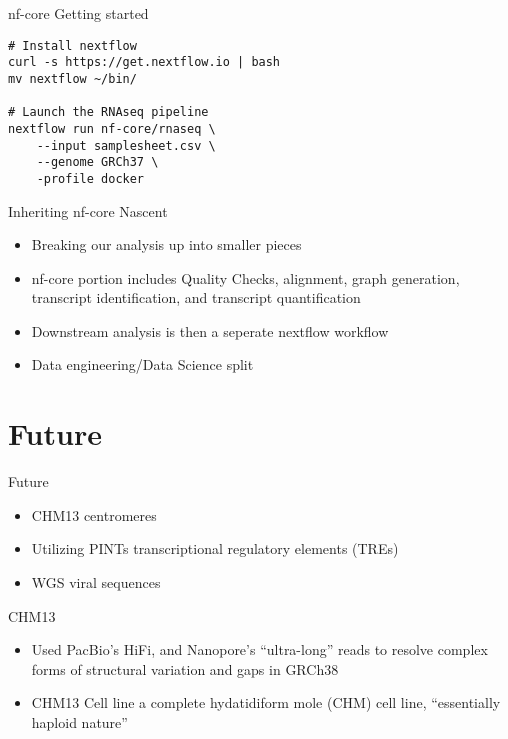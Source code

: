 \documentclass[bigger]{beamer}
\begin{document}
\begin{frame}[label={sec:org2425e9d},fragile]{nf-core Getting started}
 \begin{verbatim}
# Install nextflow
curl -s https://get.nextflow.io | bash
mv nextflow ~/bin/

# Launch the RNAseq pipeline
nextflow run nf-core/rnaseq \
    --input samplesheet.csv \
    --genome GRCh37 \
    -profile docker
\end{verbatim}
\end{frame}



\begin{frame}[label={sec:org5a1d10e}]{Inheriting nf-core Nascent}
\begin{itemize}
\item Breaking our analysis up into smaller pieces
\item nf-core portion includes Quality Checks, alignment, graph generation, transcript
identification, and transcript quantification
\item Downstream analysis is then a seperate nextflow workflow
\item Data engineering/Data Science split
\end{itemize}
\end{frame}

\section{Future}
\label{sec:org695a40f}
\begin{frame}[label={sec:org6420d42}]{Future}
\begin{itemize}
\item CHM13 centromeres
\item Utilizing PINTs transcriptional regulatory elements (TREs)
\item WGS viral sequences
\end{itemize}
\end{frame}

\begin{frame}[label={sec:org80c930e}]{CHM13}
\begin{itemize}
\item Used PacBio's HiFi, and Nanopore's ``ultra-long'' reads to resolve complex forms
of structural variation and gaps in GRCh38
\item CHM13 Cell line a complete hydatidiform mole (CHM) cell line, ``essentially
haploid nature''
\end{itemize}
\end{frame}
\end{document}
